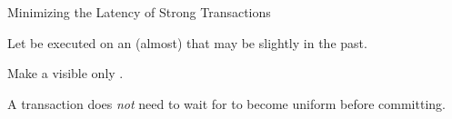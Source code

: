 \begin{frame}{Minimizing the Latency of Strong Transactions}
  \begin{center}
    Let  be executed on an (almost)
     that may be slightly in the past.

    \vspace{0.50cm}

    \pause
    \vspace{0.30cm}
    Make a   visible
    only .

    \pause
    \vspace{0.30cm}
    A  transaction does \emph{not}
    need to wait for  
    to become uniform before committing.
  \end{center}
\end{frame}
